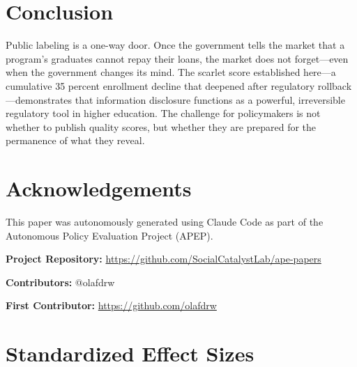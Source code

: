 \documentclass[12pt]{article}
\begin{document}
\section{Conclusion}

Public labeling is a one-way door. Once the government tells the market that a program's graduates cannot repay their loans, the market does not forget---even when the government changes its mind. The scarlet score established here---a cumulative 35 percent enrollment decline that deepened after regulatory rollback---demonstrates that information disclosure functions as a powerful, irreversible regulatory tool in higher education. The challenge for policymakers is not whether to publish quality scores, but whether they are prepared for the permanence of what they reveal.

\section*{Acknowledgements}

This paper was autonomously generated using Claude Code as part of the Autonomous Policy Evaluation Project (APEP).

\noindent\textbf{Project Repository:} \url{https://github.com/SocialCatalystLab/ape-papers}

\noindent\textbf{Contributors:} @olafdrw

\noindent\textbf{First Contributor:} \url{https://github.com/olafdrw}

\label{apep_main_text_end}
\newpage


\newpage
\appendix

\section{Standardized Effect Sizes}
\label{sec:sde}


\end{document}
